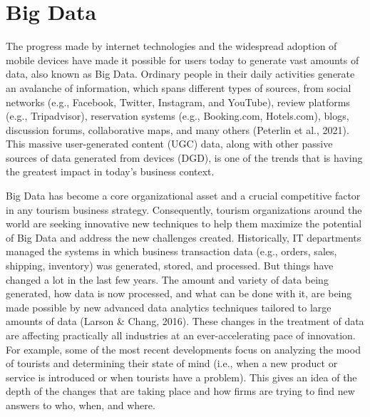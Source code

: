 \documentclass[
  letterpaper,
  DIV=11,
  numbers=noendperiod]{scrreprt}
\begin{document}
\hypertarget{big-data}{%
\chapter{Big Data}\label{big-data}}

The progress made by internet technologies and the widespread adoption
of mobile devices have made it possible for users today to generate vast
amounts of data, also known as Big Data. Ordinary people in their daily
activities generate an avalanche of information, which spans different
types of sources, from social networks (e.g., Facebook, Twitter,
Instagram, and YouTube), review platforms (e.g., Tripadvisor),
reservation systems (e.g., Booking.com, Hotels.com), blogs, discussion
forums, collaborative maps, and many others (Peterlin et al., 2021).
This massive user-generated content (UGC) data, along with other passive
sources of data generated from devices (DGD), is one of the trends that
is having the greatest impact in today's business context.

Big Data has become a core organizational asset and a crucial
competitive factor in any tourism business strategy. Consequently,
tourism organizations around the world are seeking innovative new
techniques to help them maximize the potential of Big Data and address
the new challenges created. Historically, IT departments managed the
systems in which business transaction data (e.g., orders, sales,
shipping, inventory) was generated, stored, and processed. But things
have changed a lot in the last few years. The amount and variety of data
being generated, how data is now processed, and what can be done with
it, are being made possible by new advanced data analytics techniques
tailored to large amounts of data (Larson \& Chang, 2016). These changes
in the treatment of data are affecting practically all industries at an
ever-accelerating pace of innovation. For example, some of the most
recent developments focus on analyzing the mood of tourists and
determining their state of mind (i.e., when a new product or service is
introduced or when tourists have a problem). This gives an idea of the
depth of the changes that are taking place and how firms are trying to
find new answers to who, when, and where.
\end{document}
